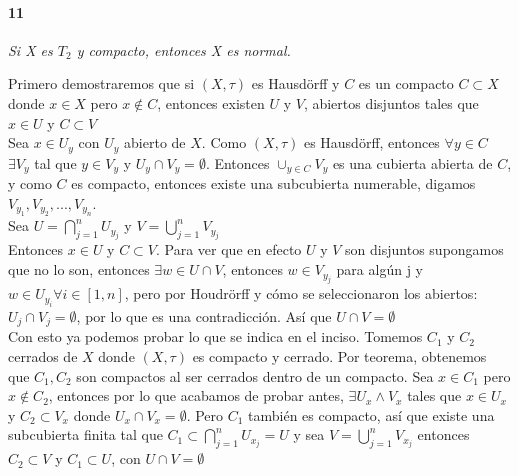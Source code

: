\documentclass[12pt]{article}
\begin{document}
\paragraph{11}
\textit{Si X es $T_2$ y compacto, entonces X es normal.}

Primero demostraremos que si $(X, \tau)$ es Hausdörff y $C$ es un compacto $C\subset X$ donde $x \in X$ pero $x \notin C$, entonces existen $U$ y $V$, abiertos disjuntos tales que $x \in U$ y $C \subset V$
\\ Sea $x\in U_{y} $ con $U_y$ abierto de $X$. Como $(X, \tau)$ es Hausdörff, entonces $\forall y \in C$ $\exists V_{y}$ tal que $y \in V_{y}$ y $U_y \cap V_{y}=\emptyset$. Entonces $\cup_{y\in C}V_{y}$ es una cubierta abierta de $C$, y como $C$ es compacto, entonces existe una subcubierta numerable, digamos $V_{y_{1}},V_{y_2},...,V_{y_n}$.
\\Sea $U=\bigcap_{j=1}^nU_{y_j}$ y $ V=\bigcup_{j=1}^nV_{y_j}$
\\Entonces  $x\in U$ y $C\subset V$. Para ver que en efecto $U$ y $V$ son disjuntos supongamos que no lo son, entonces $\exists w \in U\cap V$, entonces $w \in V_{y_j}$ para algún j y $w\in U_{y_i} \forall i\in [1,n] $, pero por Houdrörff y cómo se seleccionaron los abiertos: $U_j\cap V_j=\emptyset$, por lo que es una contradicción. Así que $U\cap V=\emptyset$
\\Con esto ya podemos probar lo que se indica en el inciso. Tomemos $C_1$ y $C_2$ cerrados de $X$ donde $(X, \tau )$ es compacto y cerrado. Por teorema, obtenemos que $C_1,C_2$ son compactos al ser cerrados dentro de un compacto. Sea $x\in C_1$ pero $x\notin C_2$, entonces por lo que acabamos de probar antes, $\exists U_x \wedge V_x$ tales que $x \in U_x$ y $C_2 \subset V_x$ donde $U_x \cap V_x=\emptyset$. Pero $C_1$ también es compacto, así que existe una subcubierta finita tal que $C_1 \subset \bigcap_{j=1}^nU_{x_j}=U$ y sea $V= \bigcup_{j=1}^nV_{x_j}$ entonces $C_2 \subset V$ y $C_1\subset U$, con $U \cap V=\emptyset$
\end{document}
